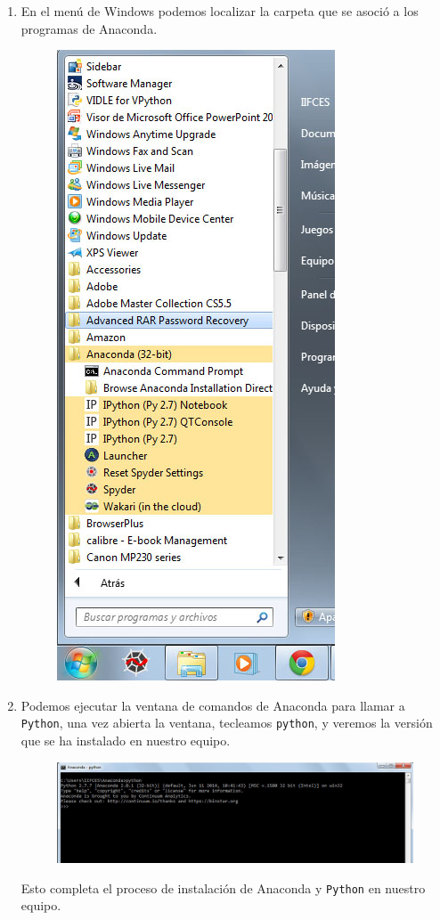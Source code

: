\documentclass[12pt]{article}
\begin{document}
\begin{enumerate}
\item En el menú de Windows podemos localizar la carpeta que se asoció a los programas de Anaconda.
\begin{figure}[H]
	\centering
	\includegraphics[scale=0.5]{Imagenes/Instalacion_Anaconda_09.jpg} 
\end{figure}
\item Podemos ejecutar la ventana de comandos de Anaconda para llamar a \texttt{Python}, una vez abierta la ventana, tecleamos \texttt{python}, y veremos la versión que se ha instalado en nuestro equipo.
\begin{figure}[H]
	\centering
	\includegraphics[scale=0.5]{Imagenes/Instalacion_Anaconda_10.jpg} 
\end{figure}
Esto completa el proceso de instalación de Anaconda y \texttt{Python} en nuestro equipo.
\end{enumerate}
\end{document}
